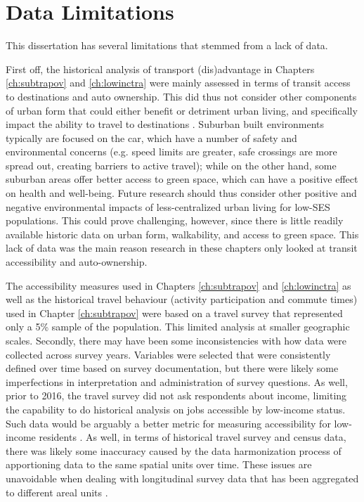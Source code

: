\section{Data Limitations}

This dissertation has several limitations that stemmed from a lack of data.

First off, the historical analysis of transport (dis)advantage in Chapters \ref{ch:subtrapov} and \ref{ch:lowinctra} were mainly assessed in terms of transit access to destinations and auto ownership. This did thus not consider other components of urban form that could either benefit or detriment urban living, and specifically impact the ability to travel to destinations \cite{ewing_relationship_2003,ewing2014measuring}. Suburban built environments typically are focused on the car, which have a number of safety and environmental concerns (e.g. speed limits are greater, safe crossings are more spread out, creating barriers to active travel); while on the other hand, some suburban areas offer better access to green space, which can have a positive effect on health and well-being. Future research should thus consider other positive and negative environmental impacts of less-centralized urban living for low-SES populations. This could prove challenging, however, since there is little readily available historic data on urban form, walkability, and access to green space. This lack of data was the main reason research in these chapters only looked at transit accessibility and auto-ownership.

The accessibility measures used in Chapters \ref{ch:subtrapov} and \ref{ch:lowinctra} as well as the historical travel behaviour (activity participation and commute times) used in Chapter \ref{ch:subtrapov} were based on a travel survey that represented only a 5\% sample of the population. This limited analysis at smaller geographic scales. Secondly, there may have been some inconsistencies with how data were collected across survey years. Variables were selected that were consistently defined over time based on survey documentation, but there were likely some imperfections in interpretation and administration of survey questions. As well, prior to 2016, the travel survey did not ask respondents about income, limiting the capability to do historical analysis on jobs accessible by low-income status. Such data would be arguably a better metric for measuring accessibility for low-income residents \cite{fan_impact_2012,cui_accessibility_2019,allen_sizing_2019}. As well, in terms of historical travel survey and census data, there was likely some inaccuracy caused by the data harmonization process of apportioning data to the same spatial units over time. These issues are unavoidable when dealing with longitudinal survey data that has been aggregated to different areal units \cite{logan_interpolating_2014,allen_new_2018}. 

